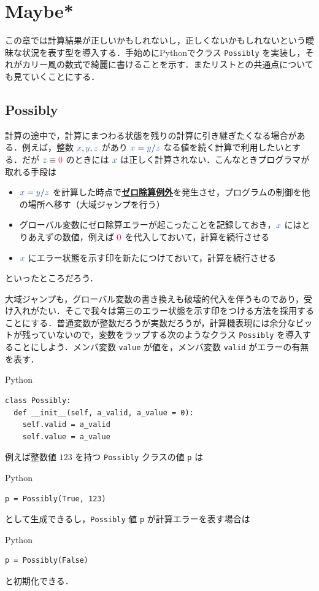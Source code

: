 \documentclass[a5paper,twoside,fleqn,draft]{jsbook}
\def\constantColor{WildStrawberry}
\def\varColor{NavyBlue}
\newcommand{\programminglanguage}[1]{\textsf{#1}}
\newcommand{\python}{\programminglanguage{Python}}
\newenvironment{leader}{\begingroup\gt}{\endgroup}
\newcommand{\keyword}[1]{{\underline{\textbf{#1}}}}
\newcommand{\code}[1]{\texttt{#1}}
\newenvironment{pythoncode}{\begin{itembox}[r]{\python}}{\end{itembox}}
\newcommand{\mConstant}[1]{\textcolor{\constantColor}{#1}}
\newcommand{\mZeroNumber}{{\mConstant{0}}}
\newcommand{\mVar}[1]{\textcolor{\varColor}{#1}}
\newcommand{\mXVar}{\mVar{x}}
\newcommand{\mYVar}{\mVar{y}}
\newcommand{\mZVar}{\mVar{z}}
\begin{document}
\chapter{Maybe*}
\label{ch:maybe}

\begin{leader}
この章では計算結果が正しいかもしれないし，正しくないかもしれないという曖昧な状況を表す型を導入する．手始めに\python でクラス \code{Possibly} を実装し，それがカリー風の数式で綺麗に書けることを示す．またリストとの共通点についても見ていくことにする．
\end{leader}

\section{Possibly}

計算の途中で，計算にまつわる状態を残りの計算に引き継ぎたくなる場合がある．例えば，整数 $\mXVar,\mYVar,\mZVar$ があり $\mXVar=\mYVar/\mZVar$ なる値を続く計算で利用したいとする．だが $\mZVar\equiv\mZeroNumber$ のときには $\mXVar$ は正しく計算されない．こんなときプログラマが取れる手段は
\begin{itemize}
\item $\mXVar=\mYVar/\mZVar$ を計算した時点で\keyword{ゼロ除算例外}を発生させ，プログラムの制御を他の場所へ移す（大域ジャンプを行う）
\item グローバル変数にゼロ除算エラーが起こったことを記録しておき，$\mXVar$ にはとりあえずの数値，例えば $\mZeroNumber$ を代入しておいて，計算を続行させる
\item $\mXVar$ にエラー状態を示す印を新たにつけておいて，計算を続行させる
\end{itemize}
といったところだろう．

大域ジャンプも，グローバル変数の書き換えも破壊的代入を伴うものであり，受け入れがたい．そこで我々は第三のエラー状態を示す印をつける方法を採用することにする．普通変数が整数だろうが実数だろうが，計算機表現には余分なビットが残っていないので，変数をラップする次のようなクラス \code{Possibly} を導入することにしよう．メンバ変数 \code{value} が値を，メンバ変数 \code{valid} がエラーの有無を表す．
\begin{pythoncode}
\begin{verbatim}
class Possibly:
  def __init__(self, a_valid, a_value = 0):
    self.valid = a_valid
    self.value = a_value
\end{verbatim}
\end{pythoncode}

例えば整数値 $123$ を持つ \code{Possibly} クラスの値 \code{p} は
\begin{pythoncode}
\begin{verbatim}
p = Possibly(True, 123)
\end{verbatim}
\end{pythoncode}
として生成できるし，\code{Possibly} 値 \code{p} が計算エラーを表す場合は
\begin{pythoncode}
\begin{verbatim}
p = Possibly(False)
\end{verbatim}
\end{pythoncode}
と初期化できる．
\end{document}
